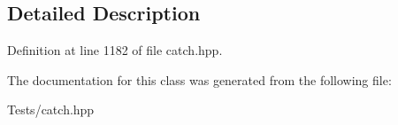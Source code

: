 \subsection{Detailed Description}


Definition at line 1182 of file catch.\+hpp.



The documentation for this class was generated from the following file\+:\begin{DoxyCompactItemize}
\item 
Tests/catch.\+hpp\end{DoxyCompactItemize}
